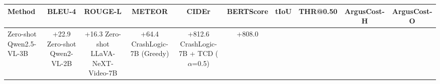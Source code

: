 \begin{tabular}{lccccccccc}
\toprule
Method & BLEU-4 & ROUGE-L & METEOR & CIDEr & BERTScore & tIoU & THR@0.50 & ArgusCost-H & ArgusCost-O \\
\midrule
Zero-shot Qwen2.5-VL-3B & +22.9%
Zero-shot Qwen2-VL-2B & +16.3%
Zero-shot LLaVA-NeXT-Video-7B & +64.4%
CrashLogic-7B (Greedy) & +812.6%
CrashLogic-7B + TCD ($\alpha$=0.5) & +808.0%
\bottomrule
\end{tabular}
